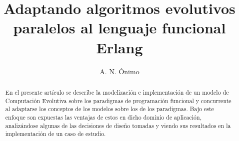 \documentclass[runningheads]{llncs}
\begin{document}
\mainmatter  %

\title{Adaptando algoritmos evolutivos paralelos al lenguaje funcional Erlang}

\author{A. N. Ónimo}

%


\institute{ \mailsa}

\maketitle
\begin{abstract}
En el presente artículo se describe la modelización e implementación de un modelo de Computación Evolutiva sobre los paradigmas de programación funcional y concurrente al adaptarse los conceptos de los modelos sobre los de los paradigmas. Bajo este enfoque son expuestas las ventajas de estos en dicho dominio de aplicación, analizándose algunas de las decisiones de diseño tomadas y viendo sus resultados en la implementación de un caso de estudio.
\end{abstract}
\end{document}
